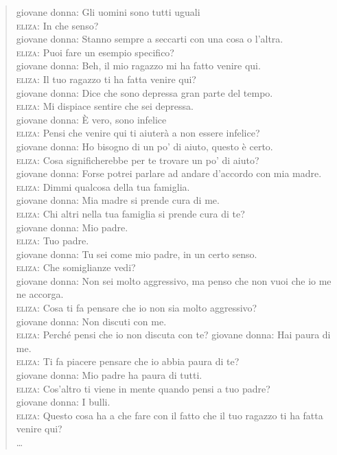\begin{verse}
giovane donna: Gli uomini sono tutti uguali\\
\textsc{eliza}: In che senso?\\
giovane donna: Stanno sempre a seccarti con una cosa o l'altra.\\
\textsc{eliza}: Puoi fare un esempio specifico?\\
giovane donna: Beh, il mio ragazzo mi ha fatto venire qui.\\
\textsc{eliza}: Il tuo ragazzo ti ha fatta venire qui?\\
giovane donna: Dice che sono depressa gran parte del tempo.\\
\textsc{eliza}: Mi dispiace sentire che sei depressa.\\
giovane donna: \`{E} vero, sono infelice\\
\textsc{eliza}: Pensi che venire qui ti aiuterà a non essere infelice?\\
giovane donna: Ho bisogno di un po' di aiuto, questo è certo.\\
\textsc{eliza}: Cosa significherebbe per te trovare un po' di aiuto?\\
giovane donna: Forse potrei parlare ad andare d'accordo con mia madre.\\
\textsc{eliza}: Dimmi qualcosa della tua famiglia.\\
giovane donna: Mia madre si prende cura di me.\\
\textsc{eliza}: Chi altri nella tua famiglia si prende cura di te?\\
giovane donna: Mio padre.\\
\textsc{eliza}: Tuo padre.\\
giovane donna: Tu sei come mio padre, in un certo senso.\\
\textsc{eliza}: Che somiglianze vedi?\\
giovane donna: Non sei molto aggressivo, ma penso che non vuoi che io me ne accorga.\\
\textsc{eliza}: Cosa ti fa pensare che io non sia molto aggressivo?\\
giovane donna: Non discuti con me.\\
\textsc{eliza}: Perché pensi che io non discuta con te?
giovane donna: Hai paura di me.\\
\textsc{eliza}: Ti fa piacere pensare che io abbia paura di te?\\
giovane donna: Mio padre ha paura di tutti.\\
\textsc{eliza}: Cos'altro ti viene in mente quando pensi a tuo padre?\\
giovane donna: I bulli.\\
\textsc{eliza}: Questo cosa ha a che fare con il fatto che il tuo ragazzo ti ha fatta venire qui?\\
{\ldots}
\end{verse}

